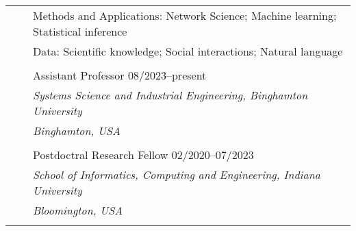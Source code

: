 \documentclass[letterpaper, 11pt]{article}
\begin{document}
\setlength\LTleft{0cm}
\begin{longtable}{p{1.3in}p{2em}p{5.5in}}


    \multirow{2}{1.3in}{{\color{OliveGreen}{RESEARCH INTERESTS}}}
                                                    & &\hspace{-3em} Methods and Applications: Network Science; Machine learning; Statistical inference\\
                                                    & &\hspace{-3em} Data: Scientific knowledge; Social interactions; Natural language \\
                                                    & & \\

    \multirow{2}{1.3in}{{\color{OliveGreen}{ACADEMIC POSITION}}}
                                                    & &\hspace{-3em}  Assistant Professor \hfill 08/2023--present \\
                                                    & &\hspace{-3em}  \textit{Systems Science and Industrial Engineering, Binghamton University}\\
                                                    & &\hspace{-3em}  \textit{Binghamton, USA} \\
                                                    & &                                                                                                                                                                                                                          \\

                                                    & &\hspace{-3em}  Postdoctral Research Fellow \hfill 02/2020--07/2023 \\
                                                    & &\hspace{-3em}  \textit{School of Informatics, Computing and Engineering, Indiana University}\\
                                                    & &\hspace{-3em}  \textit{Bloomington, USA} \\
                                                    & &                                                                                                                                                                                                                          \\


\end{longtable}
\end{document}
